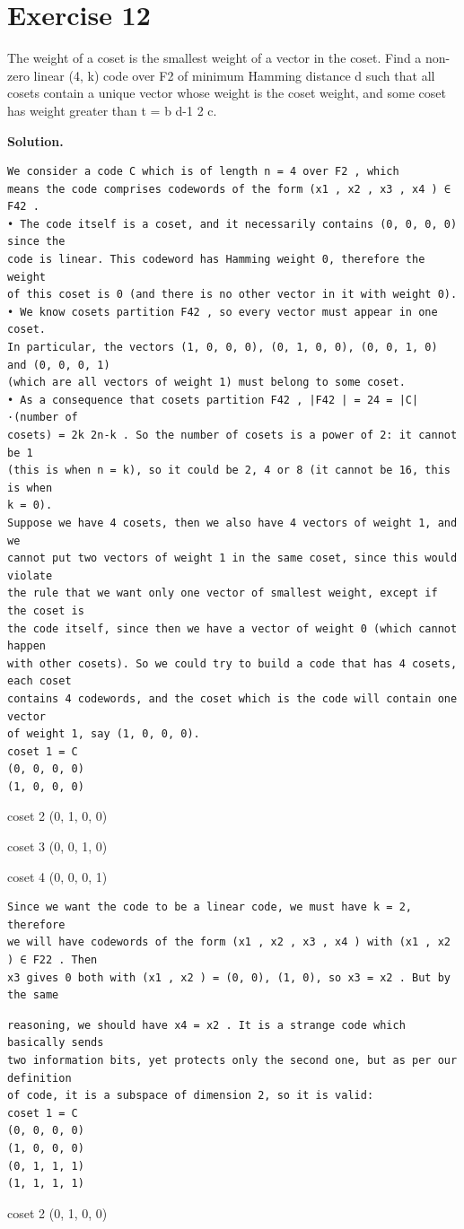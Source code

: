 \documentclass[11pt]{article}
\begin{document}
\section*{Exercise 12}
\begin{exercisebox}
 The weight of a coset is the smallest weight of a vector in the coset. Find a non-zero linear (4, k) code over F2 of minimum Hamming distance d such that all cosets contain a unique vector whose weight is the coset weight, and some coset has weight greater than t = b d-1 2 c.

\end{exercisebox}
\begin{solutionbox}
\textbf{Solution.}

\begin{Verbatim}[fontsize=\small]
We consider a code C which is of length n = 4 over F2 , which
means the code comprises codewords of the form (x1 , x2 , x3 , x4 ) ∈ F42 .
• The code itself is a coset, and it necessarily contains (0, 0, 0, 0) since the
code is linear. This codeword has Hamming weight 0, therefore the weight
of this coset is 0 (and there is no other vector in it with weight 0).
• We know cosets partition F42 , so every vector must appear in one coset.
In particular, the vectors (1, 0, 0, 0), (0, 1, 0, 0), (0, 0, 1, 0) and (0, 0, 0, 1)
(which are all vectors of weight 1) must belong to some coset.
• As a consequence that cosets partition F42 , |F42 | = 24 = |C|·(number of
cosets) = 2k 2n-k . So the number of cosets is a power of 2: it cannot be 1
(this is when n = k), so it could be 2, 4 or 8 (it cannot be 16, this is when
k = 0).
Suppose we have 4 cosets, then we also have 4 vectors of weight 1, and we
cannot put two vectors of weight 1 in the same coset, since this would violate
the rule that we want only one vector of smallest weight, except if the coset is
the code itself, since then we have a vector of weight 0 (which cannot happen
with other cosets). So we could try to build a code that has 4 cosets, each coset
contains 4 codewords, and the coset which is the code will contain one vector
of weight 1, say (1, 0, 0, 0).
coset 1 = C
(0, 0, 0, 0)
(1, 0, 0, 0)
\end{Verbatim}
coset 2 (0, 1, 0, 0)

coset 3 (0, 0, 1, 0)

coset 4 (0, 0, 0, 1)

\begin{Verbatim}[fontsize=\small]
Since we want the code to be a linear code, we must have k = 2, therefore
we will have codewords of the form (x1 , x2 , x3 , x4 ) with (x1 , x2 ) ∈ F22 . Then
x3 gives 0 both with (x1 , x2 ) = (0, 0), (1, 0), so x3 = x2 . But by the same
\end{Verbatim}
\begin{Verbatim}[fontsize=\small]
reasoning, we should have x4 = x2 . It is a strange code which basically sends
two information bits, yet protects only the second one, but as per our definition
of code, it is a subspace of dimension 2, so it is valid:
coset 1 = C
(0, 0, 0, 0)
(1, 0, 0, 0)
(0, 1, 1, 1)
(1, 1, 1, 1)
\end{Verbatim}
coset 2 (0, 1, 0, 0)


\end{solutionbox}
\end{document}
